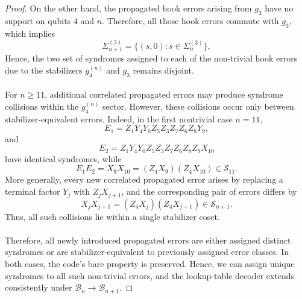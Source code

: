 \documentclass[reprint, amsmath,amssymb, aps,pra,
 floatfix,
]{revtex4-2}
\begin{document}
\begin{proof}
\noindent On the other hand, the propagated hook errors arising from $g_3$ have no support on qubits $4$ and $n$.
Therefore, all those hook errors commute with $g_3$, which implies
\[
\Sigma_{n+1}^{(3)} = \{(s,0): s\in \Sigma_n^{(3)}\},
\]
Hence, the two set of syndromes assigned to each of the non-trivial hook errors due to the stabilizers $g_4^{(n)}$ and $g_3$ remains disjoint.\\\\
For $n\ge 11$, additional correlated propagated errors may produce syndrome collisions within the $g_4^{(n)}$ sector. However, these collisions occur only between stabilizer-equivalent errors. 
Indeed, in the first nontrivial case $n=11$,
\[
E_1=Z_1Y_4Y_0Z_5Z_3Z_7Z_6Z_8Y_9,\] and \[
E_2=Z_1Y_4Y_0Z_5Z_3Z_7Z_6Z_8Z_9X_{10}
\]
have identical syndromes, while
\[
E_1E_2 = X_9X_{10}=(Z_4X_9)(Z_4X_{10})\in\mathcal S_{11}.
\]
More generally, every new correlated propagated error arises by replacing a terminal factor $Y_j$ with $Z_jX_{j+1}$, and the corresponding pair of errors differs by
\[
X_jX_{j+1}=(Z_4X_j)(Z_4X_{j+1})\in\mathcal S_{n+1}.
\]
Thus, all such collisions lie within a single stabilizer coset.\\\\
\noindent Therefore, all newly introduced propagated errors are either assigned distinct syndromes or are stabilizer-equivalent to previously assigned error classes. In both cases, the code's bare property is preserved. 
Hence, we can assign unique syndromes to all such non-trivial errors, and the lookup-table decoder extends consistently under $\mathcal{B}_n\to\mathcal{B}_{n+1}$.

\end{proof}
\end{document}
